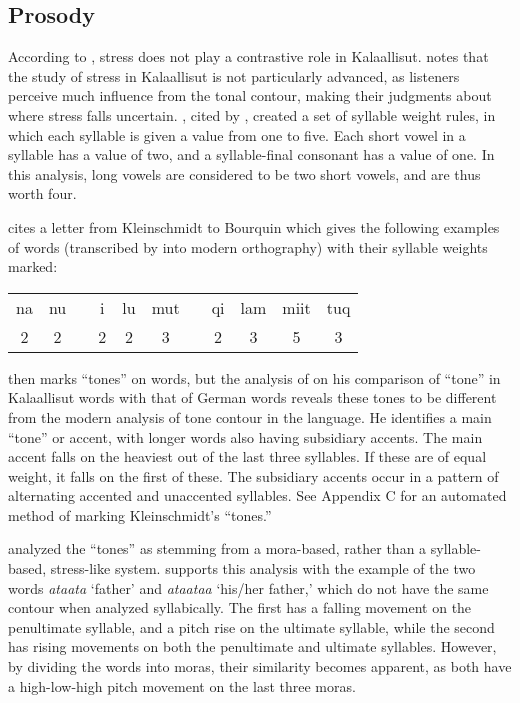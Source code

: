\documentclass[12pt]{article}
\begin{document}
	\subsection{Prosody}

	According to \citet{grammar}, stress does not play a contrastive role in Kalaallisut. \citet{rischel} notes that the study of stress in Kalaallisut is not particularly advanced, as listeners perceive much influence from the tonal contour, making their judgments about where stress falls uncertain. \citet{kleinschmidt}, cited by \citet{rischel}, created a set of syllable weight rules, in which each syllable is given a value from one to five. Each short vowel in a syllable has a value of two, and a syllable-final consonant has a value of one. In this analysis, long vowels are considered to be two short vowels, and are thus worth four. \par

	\citet{kleinletter} cites a letter from Kleinschmidt to Bourquin which gives the following examples of words (transcribed by \citet{rischel} into modern orthography) with their syllable weights marked:

	\begin{exe}
	\item
	\begin{tabular}{ccccccccccc}
	na & nu & & i & lu & mut & & qi & lam & miit & tuq \\
	2 & 2 & & 2 & 2 & 3 & & 2 & 3 & 5 & 3 \\
	\end{tabular}
	\end{exe}

	\citet{kleinschmidt} then marks ``tones'' on words, but the analysis of \citet{rischel} on his comparison of ``tone'' in Kalaallisut words with that of German words reveals these tones to be different from the modern analysis of tone contour in the language. He identifies a main ``tone'' or accent, with longer words also having subsidiary accents. The main accent falls on the heaviest out of the last three syllables. If these are of equal weight, it falls on the first of these. The subsidiary accents occur in a pattern of alternating accented and unaccented syllables. See Appendix C for an automated method of marking Kleinschmidt's ``tones.'' \par

	\citet{rischel} analyzed the ``tones'' as stemming from a mora-based, rather than a syllable-based, stress-like system. \citet{anja} supports this analysis with the example  of the two words \textit{ataata} `father' and \textit{ataataa} `his/her father,' which do not have the same contour when analyzed syllabically. The first has a falling movement on the penultimate syllable, and a pitch rise on the ultimate syllable, while the second has rising movements on both the penultimate and ultimate syllables. However, by dividing the words into moras, their similarity becomes apparent, as both have a high-low-high pitch movement on the last three moras. \par
\end{document}
